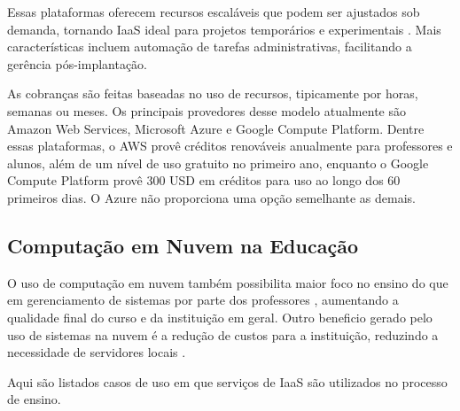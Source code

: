 \documentclass[tg]{mdtufsm}
\begin{document}
Essas plataformas oferecem recursos escaláveis que podem ser ajustados sob demanda, tornando IaaS ideal para projetos temporários e experimentais \cite{iaas}. Mais características incluem automação de tarefas administrativas, facilitando a gerência pós-implantação.

As cobranças são feitas baseadas no uso de recursos, tipicamente por horas, semanas ou meses. Os principais provedores desse modelo atualmente são Amazon Web Services, Microsoft Azure e Google Compute Platform. Dentre essas plataformas, o AWS provê créditos renováveis anualmente para professores e alunos, além de um nível de uso gratuito no primeiro ano, enquanto o Google Compute Platform provê 300 USD em créditos para uso ao longo dos 60 primeiros dias. O Azure não proporciona uma opção semelhante as demais.


\subsection{Computação em Nuvem na Educação}

O uso de computação em nuvem também possibilita maior foco no ensino do que em gerenciamento de sistemas por parte dos professores \cite{cloudedu}, aumentando a qualidade final do curso e da instituição em geral. Outro beneficio gerado pelo uso de sistemas na nuvem é a redução de custos para a instituição, reduzindo a necessidade de servidores locais \cite{toutcloud}.

Aqui são listados casos de uso em que serviços de IaaS são utilizados no processo de ensino.
\end{document}
